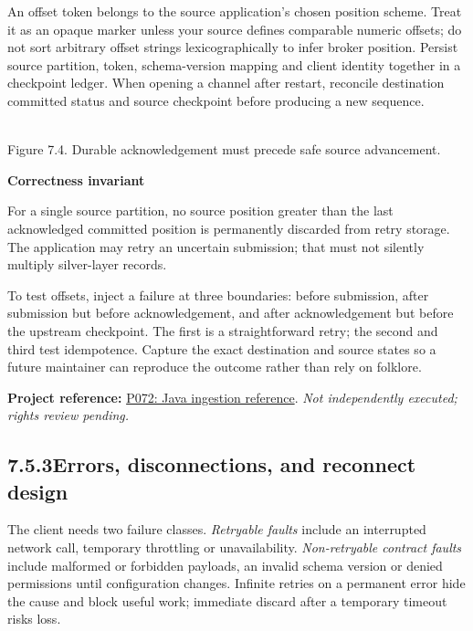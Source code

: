 \documentclass[11pt,twoside]{article}
\newcommand{\topic}[2]{\subsection*{#1\quad #2}}
\newcommand{\repo}[2]{\par\begingroup\fontsize{8.0}{9.6}\selectfont\sffamily\color{inkgray}\textbf{Project reference:} \href{#2}{#1}. \textit{Not independently executed; rights review pending.}\par\endgroup}
\begin{document}
An offset token belongs to the source application's chosen position scheme. Treat it as an opaque marker unless your source defines comparable numeric offsets; do not sort arbitrary offset strings lexicographically to infer broker position. Persist source partition, token, schema-version mapping and client identity together in a checkpoint ledger. When opening a channel after restart, reconcile destination committed status and source checkpoint before producing a new sequence.
\begin{center}\\{\fontsize{8}{9}\selectfont\color{inkgray}Figure 7.4. Durable acknowledgement must precede safe source advancement.}\end{center}
\begin{insight}\textbf{Correctness invariant}\par
For a single source partition, no source position greater than the last acknowledged committed position is permanently discarded from retry storage. The application may retry an uncertain submission; that must not silently multiply silver-layer records.\end{insight}
To test offsets, inject a failure at three boundaries: before submission, after submission but before acknowledgement, and after acknowledgement but before the upstream checkpoint. The first is a straightforward retry; the second and third test idempotence. Capture the exact destination and source states so a future maintainer can reproduce the outcome rather than rely on folklore.
\repo{P072: Java ingestion reference}{https://github.com/snowflakedb/snowflake-ingest-java}
\newpage
\topic{7.5.3}{Errors, disconnections, and reconnect design}
The client needs two failure classes. \emph{Retryable faults} include an interrupted network call, temporary throttling or unavailability. \emph{Non-retryable contract faults} include malformed or forbidden payloads, an invalid schema version or denied permissions until configuration changes. Infinite retries on a permanent error hide the cause and block useful work; immediate discard after a temporary timeout risks loss.
\end{document}
